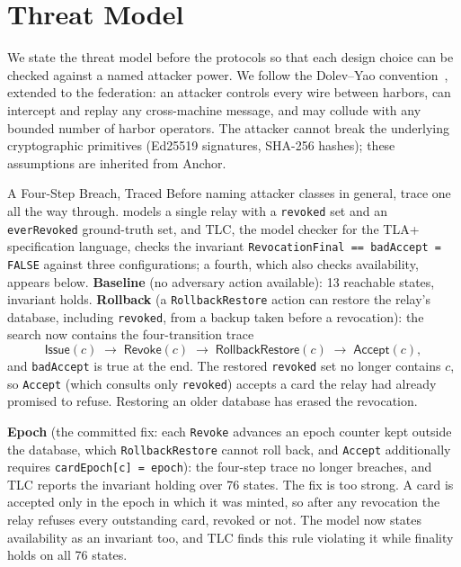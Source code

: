 \documentclass[11pt,a4paper]{article}
\theoremstyle{definition}
\theoremstyle{remark}
\begin{document}
\section{Threat Model}\label{sec:fh-threat-model}
We state the threat model before the protocols so that each design choice can be checked against a named attacker power. We follow the Dolev--Yao convention~, extended to the federation: an attacker controls every wire between harbors, can intercept and replay any cross-machine message, and may collude with any bounded number of harbor operators. The attacker cannot break the underlying cryptographic primitives (Ed25519 signatures, SHA-256 hashes); these assumptions are inherited from Anchor.
\begin{pdexample}{A Four-Step Breach, Traced}
\setlength{\parskip}{4pt plus 1pt}
Before naming attacker classes in general, trace one all the way through.  models a single relay with a \texttt{revoked} set and an \texttt{everRevoked} ground-truth set, and TLC, the model checker for the TLA+ specification language, checks the invariant \texttt{RevocationFinal == badAccept = FALSE} against three configurations; a fourth, which also checks availability, appears below.
\textbf{Baseline} (no adversary action available): 13 reachable states, invariant holds.
\textbf{Rollback} (a \texttt{RollbackRestore} action can restore the relay's database, including \texttt{revoked}, from a backup taken before a revocation): the search now contains the four-transition trace
\[
\mathsf{Issue}(c) \;\to\; \mathsf{Revoke}(c) \;\to\; \mathsf{RollbackRestore}(c) \;\to\; \mathsf{Accept}(c),
\]
and \texttt{badAccept} is true at the end. The restored \texttt{revoked} set no longer contains $c$, so \texttt{Accept} (which consults only \texttt{revoked}) accepts a card the relay had already promised to refuse. Restoring an older database has erased the revocation.

\textbf{Epoch} (the committed fix: each \texttt{Revoke} advances an epoch counter kept outside the database, which \texttt{RollbackRestore} cannot roll back, and \texttt{Accept} additionally requires \texttt{cardEpoch[c] = epoch}): the four-step trace no longer breaches, and TLC reports the invariant holding over 76 states. The fix is too strong. A card is accepted only in the epoch in which it was minted, so after any revocation the relay refuses every outstanding card, revoked or not. The model now states availability as an invariant too, and TLC finds this rule violating it while finality holds on all 76 states.


\end{pdexample}
\end{document}
